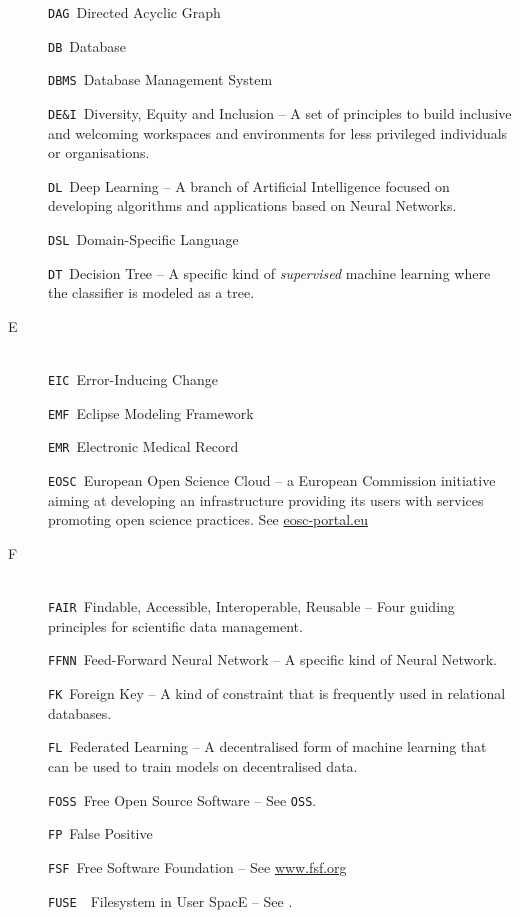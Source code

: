 \begin{description}
\verb|DAG|\quad~Directed Acyclic Graph

\verb|DB|\quad~Database

\verb|DBMS|\quad~Database Management System

\verb|DE&I|\quad~Diversity, Equity and Inclusion -- A set of principles to build inclusive and welcoming workspaces and environments for less privileged individuals or organisations.

\verb|DL|\quad~Deep Learning -- A branch of Artificial Intelligence %
 focused on developing algorithms and applications based on Neural Networks. %

\verb|DSL|\quad~Domain-Specific Language

\verb|DT|\quad~Decision Tree -- A specific kind of \emph{supervised} machine learning %
where the classifier is modeled as a tree.


\item[E]~\\
\verb|EIC|\quad~Error-Inducing Change

\verb|EMF|\quad~Eclipse Modeling Framework

\verb|EMR|\quad~Electronic Medical Record

\verb|EOSC|\quad~European Open Science Cloud -- a European Commission initiative aiming at developing an infrastructure providing its users with services promoting open science practices. See \url{eosc-portal.eu}


\item[F]~\\
\verb|FAIR|\quad~Findable, Accessible, Interoperable, Reusable -- Four guiding principles for scientific data management.

\verb|FFNN|\quad~Feed-Forward Neural Network -- A specific kind of Neural Network.%

\verb|FK|\quad~Foreign Key -- A kind of constraint that is frequently used in relational databases.

\verb|FL|\quad~Federated Learning -- A decentralised form of machine learning %
that can be used to train models on decentralised data.

\verb|FOSS|\quad~Free Open Source Software -- See \verb|OSS|.

\verb|FP|\quad~False Positive

\verb|FSF|\quad~Free Software Foundation -- See \url{www.fsf.org}

\verb|FUSE|~\quad~Filesystem in User SpacE -- See .



\end{description}
